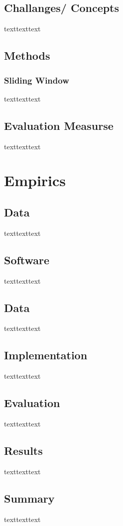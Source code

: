 \documentclass[12pt]{article}
\begin{document}
\subsection{Challanges/ Concepts}
texttexttext

\subsection{Methods}
\subsubsection{Sliding Window}
texttexttext

\subsection{Evaluation Measurse}
texttexttext

\section{Empirics}
\subsection{Data}
texttexttext

\subsection{Software}
texttexttext



\subsection{Data}
texttexttext

\subsection{Implementation}
texttexttext


\subsection{Evaluation}
texttexttext

\subsection{Results}
texttexttext

\subsection{Summary}
texttexttext




\newpage
\medskip

\end{document}
